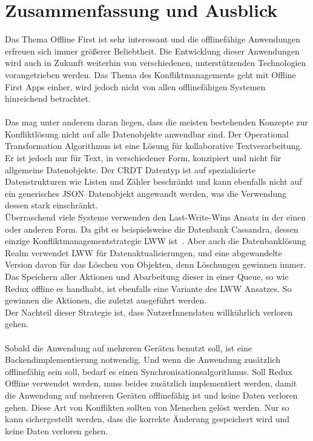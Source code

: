 \chapter{\label{chap:fazit}Zusammenfassung und Ausblick}
Das Thema Offline First ist sehr interessant und die offlinefähige Anwendungen erfreuen sich immer größerer Beliebtheit.
Die Entwicklung dieser Anwendungen wird auch in Zukunft weiterhin von verschiedenen, unterstützenden Technologien vorangetrieben werden.
Das Thema des Konfliktmanagements geht mit Offline First \glspl{App} einher, wird jedoch nicht von allen offlinefähigen Systemen hinreichend betrachtet.\\\\
Das mag unter anderem daran liegen, dass die meisten bestehenden Konzepte zur Konfliktlösung nicht auf alle Datenobjekte anwendbar sind.
Der Operational Transformation Algorithmus ist eine Lösung für kollaborative Textverarbeitung. Er ist jedoch nur für Text, in verschiedener Form, konzipiert und nicht für allgemeine Datenobjekte.
Der \gls{CRDT} Datentyp ist auf spezialisierte Datenstrukturen wie Listen und Zähler beschränkt und kann ebenfalls nicht auf ein generisches \gls{JSON}--Datenobjekt angewandt werden, was die Verwendung dessen stark einschränkt.\\
Überraschend viele Systeme verwenden den Last-Write-Wins Ansatz in der einen oder anderen Form.
Da gibt es beispielsweise die Datenbank Cassandra, dessen einzige Konfliktmanagementstrategie \gls{LWW} ist~\cite{cassandralww}.
Aber auch die Datenbanklösung Realm verwendet \gls{LWW} für Datenaktualisierungen, und eine abgewandelte Version davon für das Löschen von Objekten, denn Löschungen gewinnen immer.
Das Speichern aller Aktionen und Abarbeitung dieser in einer \gls{Queue}, so wie Redux offline es handhabt, ist ebenfalls eine Variante des \gls{LWW} Ansatzes. So gewinnen die Aktionen, die zuletzt ausgeführt werden.\\
Der Nachteil dieser Strategie ist, dass NutzerInnendaten willkührlich verloren gehen.\\\\
% 
% 
% 
Sobald die Anwendung auf mehreren Geräten benutzt soll, ist eine Backendimplementierung notwendig.
Und wenn die Anwendung zusätzlich offlinefähig sein soll, bedarf es einen Synchronisationsalgorithmus.
Soll Redux Offline verwendet werden, muss beides zusätzlich implementiert werden, damit die Anwendung auf mehreren Geräten offlinefähig ist und keine Daten verloren gehen.
Diese Art von Konflikten sollten von Menschen gelöst werden. Nur so kann sichergestellt werden, dass die korrekte Änderung gespeichert wird und keine Daten verloren gehen.\\

